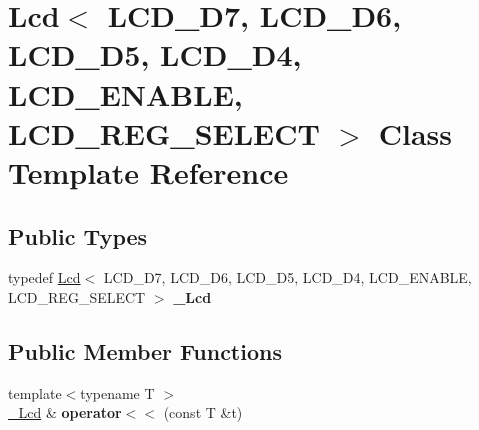 \hypertarget{classLcd}{}\section{Lcd$<$ L\+C\+D\+\_\+\+D7, L\+C\+D\+\_\+\+D6, L\+C\+D\+\_\+\+D5, L\+C\+D\+\_\+\+D4, L\+C\+D\+\_\+\+E\+N\+A\+B\+LE, L\+C\+D\+\_\+\+R\+E\+G\+\_\+\+S\+E\+L\+E\+CT $>$ Class Template Reference}
\label{classLcd}
\subsection*{Public Types}
\begin{DoxyCompactItemize}
\item 
typedef \hyperlink{classLcd}{Lcd}$<$ L\+C\+D\+\_\+\+D7, L\+C\+D\+\_\+\+D6, L\+C\+D\+\_\+\+D5, L\+C\+D\+\_\+\+D4, L\+C\+D\+\_\+\+E\+N\+A\+B\+LE, L\+C\+D\+\_\+\+R\+E\+G\+\_\+\+S\+E\+L\+E\+CT $>$ {\bfseries \+\_\+\+Lcd}\hypertarget{classLcd_ae69976feb51799d3e9991dd74b060675}{}\label{classLcd_ae69976feb51799d3e9991dd74b060675}

\end{DoxyCompactItemize}
\subsection*{Public Member Functions}
\begin{DoxyCompactItemize}
\item 
{\footnotesize template$<$typename T $>$ }\\\hyperlink{classLcd}{\+\_\+\+Lcd} \& {\bfseries operator$<$$<$} (const T \&t)\hypertarget{classLcd_ae12b6a315191a6be957d0da7479f8e7c}{}\label{classLcd_ae12b6a315191a6be957d0da7479f8e7c}

\end{DoxyCompactItemize}
